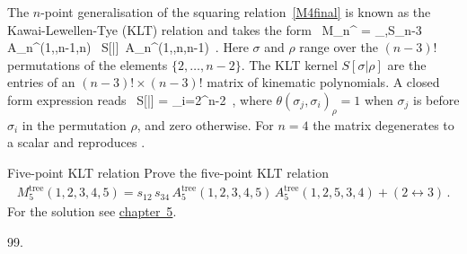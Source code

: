 The $n$-point generalisation of the squaring relation~\eqref{M4final} is known as
the  Kawai-Lewellen-Tye (KLT) relation and takes the form~\cite{ch2_Kawai:1985xq} 
%
\be  \label{eq:MtoA2}
M_{n}^{} = \sum_{\sigma,\rho\in S_{n-3}} A_{n}^{}(1,\sigma,n-1,n)
\, S[\sigma|\rho]\, A_{n}^{}(1,\rho,n,n-1)\, .
\ee
%
Here $\sigma$ and $\rho$ range over the $(n-3)!$ permutations of the elements $\{2,\ldots,n-2\}$.
The KLT  kernel $S[\sigma|\rho]$ are the entries of an $(n-3)!\times (n-3)!$ matrix of kinematic polynomials. 
A closed form expression reads~\cite{ch2_Bjerrum-Bohr:2010pnr,ch2_Bjerrum-Bohr:2010kyi}
%
\be
\label{KLTkernel}
S[\sigma|\rho] = \prod_{i=2}^{n-2} \biggl[ 
2 \, p_{1}\cdot p_{\sigma_{i}} + \sum_{j=2}^{i} 2 \, p_{\sigma_{i}}\cdot p_{\sigma_{j}}\, \theta(\sigma_{j},
\sigma_{i})_{\rho}
\biggr] \,,
\ee
where $\theta(\sigma_{j}, \sigma_{i})_{\rho}=1$ when $\sigma_{j}$ is before $\sigma_{i}$ in the permutation $\rho$,
and zero otherwise. For $n=4$ the matrix degenerates to a scalar and reproduces .


\begin{exer}{Five-point KLT relation}
\label{Ex:2.KLT}
Prove the five-point KLT relation
\begin{align} \label{eq:KLT5pt}
M_{5}^{\text{tree}}(1,2,3,4,5) = s_{12} \, s_{34} \, A_5^{\text{tree}}(1,2,3,4,5) \, A^{\text{tree}}_5(1,2,5,3,4) + (2\leftrightarrow 3) \,.
\end{align}
For the solution see \hyperref[Sol:2.KLT]{chapter~5}.
\end{exer}


\begin{thebibliography}{99.}%

\end{thebibliography}
